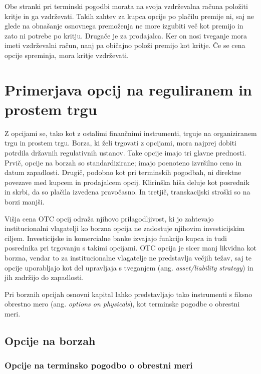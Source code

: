 \documentclass[a4paper]{article}
\begin{document}
Obe stranki pri terminski pogodbi morata na svoja vzdrževalna računa položiti kritje in ga vzdrževati. Takih zahtev za kupca opcije
po plačilu premije ni, saj ne glede na obnašanje osnovnega premoženja ne more izgubiti več kot premijo in zato ni potrebe po kritju.
Drugače je za prodajalca. Ker on nosi tveganje mora imeti vzdrževalni račun, nanj pa običajno položi premijo kot kritje. Če se cena 
opcije spreminja, mora kritje vzdrževati.

\section{Primerjava opcij na reguliranem in prostem trgu}
Z opcijami se, tako kot z ostalimi finančnimi instrumenti, trguje na organiziranem trgu in prostem trgu. Borza, ki želi trgovati
z opcijami, mora najprej dobiti potrdila državnih regulativnih ustanov. Take opcije imajo tri glavne prednosti. Prvič, opcije na borzah
so standardizirane; imajo poenoteno izvršilno ceno in datum zapadlosti. Drugič, podobno kot pri terminskih pogodbah, ni direktne povezave
med kupcem in prodajalcem opcij. Klirinška hiša deluje kot posrednik in skrbi, da so plačila izvedena pravočasno. In tretjič, transkacijski
stroški so na borzi manjši. 

Višja cena OTC opcij odraža njihovo prilagodljivost, ki jo zahtevajo institucionalni vlagatelji ko borzna opcija ne zadostuje
njihovim investicijskim ciljem. Investicijske in komercialne banke izvajajo funkcijo kupca in tudi posrednika pri trgovanju s takimi
opcijami. OTC opcija je sicer manj likvidna kot borzna, vendar to za institucionalne vlagatelje ne predstavlja večjih težav, 
saj te opcije uporabljajo kot del upravljaja s tveganjem (ang. \textit{asset/liability strategy}) in jih zadržijo do zapadlosti.

Pri borznih opcijah osnovni kapital lahko predstavljajo tako instrumenti s fiksno obrestno mero (ang. \textit{options on physicals}),
kot terminske pogodbe o obrestni meri.

\subsection{Opcije na borzah}

\subsubsection{Opcije na terminsko pogodbo o obrestni meri}
\end{document}
